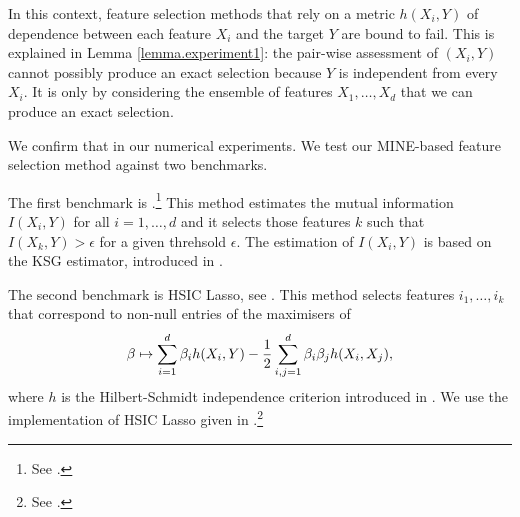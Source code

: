 In this context,
feature selection methods
that rely on a metric $h(X_i, Y)$ of dependence between 
each feature $X_i$ and the target $Y$ are bound to fail.
This is explained in Lemma \ref{lemma.experiment1}:
the pair-wise assessment of $(X_i, Y)$ 
cannot possibly produce an exact selection
because $Y$ is independent from every $X_i$. 
It is only by considering 
the ensemble of features $X_1, \dots, X_d$ 
that we can produce an exact selection.

We confirm that in our numerical experiments. 
We test 
our MINE-based feature selection method 
against 
two benchmarks.

The first benchmark is 
.\footnote{
See
.
}
This method estimates the mutual information 
$I(X_i, Y)$ for all $i = 1, \dots, d$
and 
it selects those features $k$ such that 
$I(X_k, Y) > \epsilon$
for a given threhsold $\epsilon$. 
The estimation of $I(X_i, Y)$ is based on the KSG estimator, 
introduced in 
\cite{KSG04est}.

The second benchmark is
HSIC Lasso,
see 
\cite{YJSXS14hig}.
This method 
selects features $i_1, \dots, i_k$
that correspond to non-null entries of the 
maximisers of 
\begin{equation*}
	\beta \mapsto 
	\sum_{i=1}^{d} \beta_i h(X_i, Y)
	-\frac{1}{2}
	\sum_{i,j = 1}^{d} \beta_i \beta_j h(X_i, X_j),
\end{equation*}
where $h$ is the Hilbert-Schmidt independence criterion 
introduced in 
\cite{GBSS05mea}.
We use the implementation of HSIC Lasso
given in
.\footnote{
See .
}

